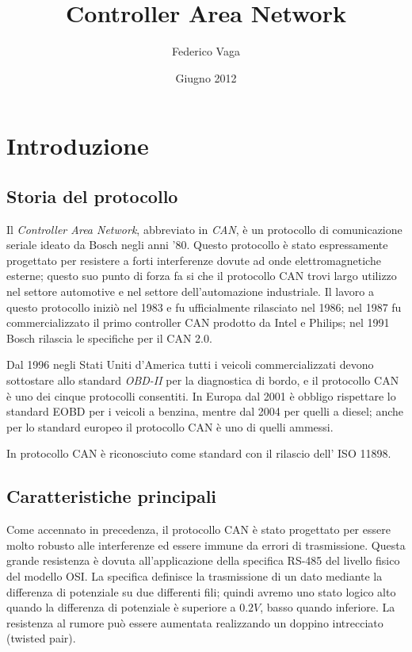 \documentclass[a4paper,10pt]{book}
\title{Controller Area Network}
\author{Federico Vaga}
\date{Giugno 2012}
\begin{document}
\maketitle


\chapter{Introduzione}
\section{Storia del protocollo}
Il \textit{Controller Area Network}, abbreviato in \textit{CAN}, è un
protocollo di comunicazione seriale ideato da Bosch negli anni '80.
Questo protocollo è stato espressamente progettato per resistere a
forti interferenze dovute ad onde elettromagnetiche esterne; questo
suo punto di forza fa si che il protocollo CAN trovi largo utilizzo
nel settore automotive e nel settore dell'automazione industriale.
Il lavoro a questo protocollo iniziò nel 1983 e fu ufficialmente
rilasciato nel 1986; nel 1987 fu commercializzato il primo controller
CAN prodotto da Intel e Philips; nel 1991 Bosch rilascia le
specifiche per il CAN 2.0.
\newline

Dal 1996 negli Stati Uniti d'America tutti i veicoli commercializzati
devono sottostare allo standard \textit{OBD-II} per la diagnostica di
bordo, e il protocollo CAN è uno dei cinque protocolli consentiti. In
Europa dal 2001 è obbligo rispettare lo standard EOBD per i veicoli a
benzina, mentre dal 2004 per quelli a diesel; anche per lo standard
europeo il protocollo CAN è uno di quelli ammessi.
\newline

In protocollo CAN è riconosciuto come standard con il rilascio dell'
ISO 11898.

\section{Caratteristiche principali}
Come accennato in precedenza, il protocollo CAN è stato progettato
per essere molto robusto alle interferenze ed essere immune da errori
di trasmissione. Questa grande resistenza è dovuta all'applicazione
della specifica RS-485 del livello fisico del modello OSI. La
specifica definisce la trasmissione di un dato mediante la differenza
di potenziale su due differenti fili; quindi avremo uno stato logico
alto quando la differenza di potenziale è superiore a $0.2V$, basso
quando inferiore. La resistenza al rumore può essere aumentata
realizzando un doppino intrecciato (twisted pair).
\newline
\end{document}
